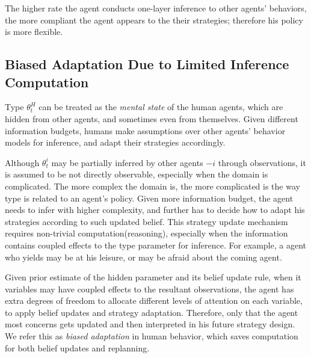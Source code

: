 \documentclass[letterpaper, 10 pt, conference]{ieeeconf}  %
\begin{document}
The higher rate the agent conducts one-layer inference to other agents' 
behaviors, the more compliant the agent appears to the their strategies; therefore his policy is more flexible. 



\subsection{Biased Adaptation Due to Limited Inference Computation}
Type $\theta^H_t$ can be treated as 
the \textit{mental state} of the human agents, which are 
hidden from other agents, and sometimes even from themselves.  
Given different information budgets, humans make assumptions over other 
agents' behavior models for inference, and adapt their strategies accordingly. 

Although $\theta^i_t$ may be partially inferred by other agents $-i$ through 
observations, it is assumed to be not directly observable, especially when the 
domain is complicated. 
The more complex the domain is, the more complicated is the way type is related 
to an agent's policy. Given more information budget, the agent needs to infer 
with higher complexity, and further has to decide how to adapt his 
strategies according to such updated belief. This strategy update mechanism 
requires non-trivial computation(reasoning), especially when the information 
contains coupled effects to the type parameter for inference. For example, a 
agent who yields may be at his leisure, or may be afraid about the coming agent.     

Given prior estimate of the hidden parameter and its 
belief update rule, when it variables may have coupled effects to the 
resultant observations, the agent has extra degrees of freedom to 
allocate different levels of attention on 
each variable, to apply belief updates and strategy adaptation. Therefore, 
only that the agent most concerns gets updated and then interpreted in his 
future strategy design. We refer this as 
\textit{biased adaptation} in human 
behavior, which saves computation for both belief updates and replanning.  

\end{document}
